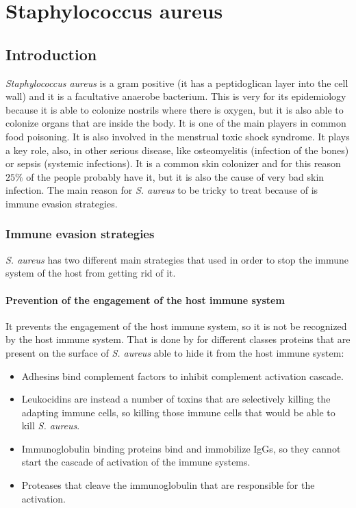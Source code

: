 \graphicspath{{chapters/images/09/}}

\chapter{Staphylococcus aureus}

\section{Introduction}
\emph{Staphylococcus aureus} is a gram positive (it has a peptidoglican layer into the cell wall) and it is a facultative anaerobe bacterium.
This is very for its epidemiology because it is able to colonize nostrils where there is oxygen, but it is also able to colonize organs that are inside the body.
It is  one of the main players in common food poisoning.
It is also involved in the menstrual toxic shock syndrome.
It plays a key role, also, in other serious disease, like osteomyelitis (infection of the bones) or sepsis (systemic infections).
It is a common skin colonizer and for this reason $25\%$ of the people probably have it, but it is also the cause of very bad skin infection.
The main reason for \emph{S. aureus} to be tricky to treat because of is immune evasion strategies.

\subsection{Immune evasion strategies}
\emph{S. aureus} has two different main strategies that used in order to stop the immune system of the host from getting rid of it.

    \subsubsection{Prevention of the engagement of the host immune system}
    It prevents the engagement of the host immune system, so it is not be recognized by the host immune system.
    That is done by for different classes proteins that are present on the  surface of \emph{S. aureus} able to hide it from the host immune system:

    \begin{multicols}{2}
        \begin{itemize}
            \item Adhesins bind complement factors to inhibit complement activation cascade.
            \item Leukocidins are instead a number of toxins that are selectively killing the adapting immune cells, so killing those immune cells that would be able to kill \emph{S. aureus}.
            \item Immunoglobulin binding proteins bind and immobilize IgGs, so they cannot start the cascade of activation of the immune systems.
            \item Proteases that cleave the immunoglobulin that are responsible for the activation.
        \end{itemize}
    \end{multicols}

